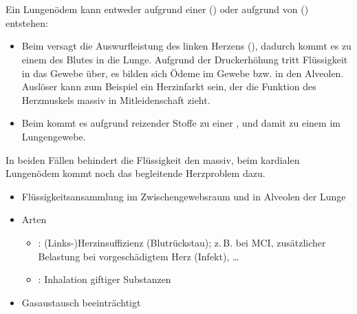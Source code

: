 \section{}
\label{topic:lungenoedem}

\nopagebreak

{%
Ein Lungenödem kann entweder aufgrund einer
 () oder aufgrund
  von  ()
entstehen:
\begin{itemize}
  \item Beim  versagt die Auswurfleistung
  des linken Herzens (), dadurch
  kommt es zu einem  des Blutes in die Lunge.
  Aufgrund der Druckerhöhung tritt Flüssigkeit in das Gewebe
  über, es bilden sich Ödeme im Gewebe bzw.
   in den Alveolen. Auslöser kann
  zum Beispiel ein Herzinfarkt sein, der die Funktion des
  Herzmuskels massiv in Mitleidenschaft zieht.
  \item Beim  kommt es aufgrund reizender
  Stoffe zu einer , und damit zu einem
   im Lungengewebe.
\end{itemize}
In beiden Fällen behindert die Flüssigkeit den
 massiv, beim kardialen Lungenödem kommt
noch das begleitende Herzproblem dazu.

}{
\begin{itemize}
  \item Flüssigkeitsansammlung im Zwischengewebsraum und in 
  Alveolen der Lunge
  \item Arten
  \begin{itemize}
    \item {}: (Links-)Herzinsuffizienz (Blutrückstau); 
    z.\,B. bei MCI, zusätzlicher Belastung bei vorgeschädigtem Herz
    (Infekt), \ldots
    \item {}: Inhalation giftiger Substanzen
  \end{itemize}
  \item Gasaustausch beeinträchtigt
\end{itemize}

}{}{}{}



